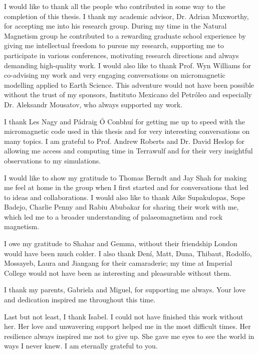 \let\cleardoublepage\clearpage
{}
{}

\begin{acknowledgements}
I would like to thank all the people who contributed in some way to the completion of this thesis. I thank my academic advisor, Dr. Adrian Muxworthy, for accepting me into his research group. During my time in the Natural Magnetism group he contributed to a rewarding graduate school experience by giving me intellectual freedom to pursue my research, supporting me to participate in various conferences, motivating research directions and always demanding high-quality work. I would also like to thank Prof. Wyn Williams for co-advising my work and very engaging conversations on micromagnetic modelling applied to Earth Science. This adventure would not have been possible without the trust of my sponsors, Instituto Mexicano del Petr\'oleo and especially Dr. Aleksandr Mousatov, who always supported my work.\par

I thank Les Nagy and P\'adraig \'O Conbhu\'i for getting me up to speed with the micromagnetic code used in this thesis and for very interesting conversations on many topics. I am grateful to Prof. Andrew Roberts and Dr. David Heslop for allowing me access and computing time in Terrawulf and for their very insightful observations to my simulations.\par

I would like to show my gratitude to Thomas Berndt and Jay Shah for making me feel at home in the group when I first started and for conversations that led to ideas and collaborations. I would also like to thank Aike Supakulopas, Sope Badejo, Charlie Penny and Rabiu Abubakar for sharing their work with me, which led me to a broader understanding of palaeomagnetism and rock magnetism.\par

I owe my gratitude to Shahar and Gemma, without their friendship London would have been much colder. I also thank Den\'i, Matt, Duna, Thibaut, Rodolfo, Mossayeb, Laura and Jiangang for their camaraderie; my time at Imperial College would not have been as interesting and pleasurable without them.\par

I thank my parents, Gabriela and Miguel, for supporting me always. Your love and dedication inspired me throughout this time.\par

Last but not least, I thank Isabel. I could not have finished this work without her. Her love and unwavering support helped me in the most difficult times. Her resilience always inspired me not to give up. She gave me eyes to see the world in ways I never knew. I am eternally grateful to you.\par
\end{acknowledgements}
